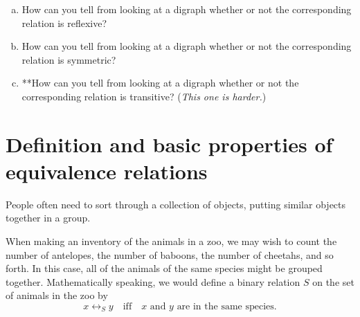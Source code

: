 \begin{exercise}{21}
\begin{enumerate}[(a)]
\item
How can you tell from looking at a digraph whether or not the corresponding relation is reflexive?
\item
How can you tell from looking at a digraph whether or not the corresponding relation is symmetric? 
\item
**How can you tell from looking at a digraph whether or not the corresponding relation is transitive? (\emph{This one is harder.})
\end{enumerate}
\end{exercise}





\section{Definition and basic properties of equivalence relations} \label{EquivalenceRelationsDefnSect}

People often need to sort through a collection of objects, putting similar objects together in a group. 

\begin{eg} \label{EquivRelZooEg}
When making an inventory of the animals in a zoo, we may wish to count the number of antelopes, the number of baboons, the number of cheetahs, and so forth. In this case, all of the animals of the same species might be grouped together. Mathematically speaking, we would define a binary relation $S$ on the set of animals in the zoo by 
\[x \rel_S y \quad \text{iff} \quad x \text{ and } y \text{ are in the same species} .\]
\end{eg}


